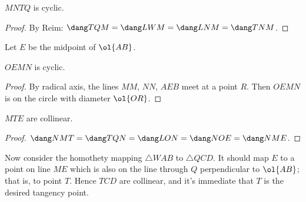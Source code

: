 \begin{claim*}
  $MNTQ$ is cyclic.
\end{claim*}
\begin{proof}
  By Reim: $\dang TQM = \dang LWM = \dang LNM = \dang TNM$.
\end{proof}

Let $E$ be the midpoint of $\ol{AB}$.
\begin{claim*}
  $OEMN$ is cyclic.
\end{claim*}
\begin{proof}
  By radical axis, the lines $MM$, $NN$, $AEB$ meet at a point $R$.
  Then $OEMN$ is on the circle with diameter $\ol{OR}$.
\end{proof}

\begin{claim*}
  $MTE$ are collinear.
\end{claim*}
\begin{proof}
  $\dang NMT = \dang TQN = \dang LON = \dang NOE = \dang NME$.
\end{proof}

Now consider the homothety mapping $\triangle WAB$
to $\triangle QCD$.
It should map $E$ to a point on line $ME$
which is also on the line through $Q$ perpendicular to $\ol{AB}$;
that is, to point $T$.
Hence $TCD$ are collinear,
and it's immediate that $T$ is the desired tangency point.
\pagebreak